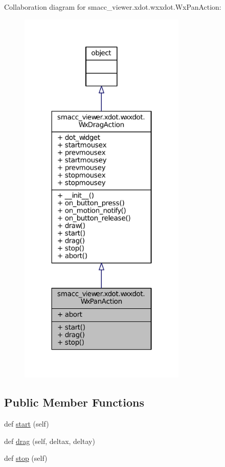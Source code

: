 Collaboration diagram for smacc\+\_\+viewer.\+xdot.\+wxxdot.\+Wx\+Pan\+Action\+:
\nopagebreak
\begin{figure}[H]
\begin{center}
\leavevmode
\includegraphics[width=226pt]{classsmacc__viewer_1_1xdot_1_1wxxdot_1_1WxPanAction__coll__graph}
\end{center}
\end{figure}
\subsection*{Public Member Functions}
\begin{DoxyCompactItemize}
\item 
def \hyperlink{classsmacc__viewer_1_1xdot_1_1wxxdot_1_1WxPanAction_a8de9c687273ce1ca292b8f2a6d3ade57}{start} (self)
\item 
def \hyperlink{classsmacc__viewer_1_1xdot_1_1wxxdot_1_1WxPanAction_ac44418edf8e2234086bbe13cb1bc8fa5}{drag} (self, deltax, deltay)
\item 
def \hyperlink{classsmacc__viewer_1_1xdot_1_1wxxdot_1_1WxPanAction_a057b1c3bb11506e51f48cf386c6dd199}{stop} (self)
\end{DoxyCompactItemize}
